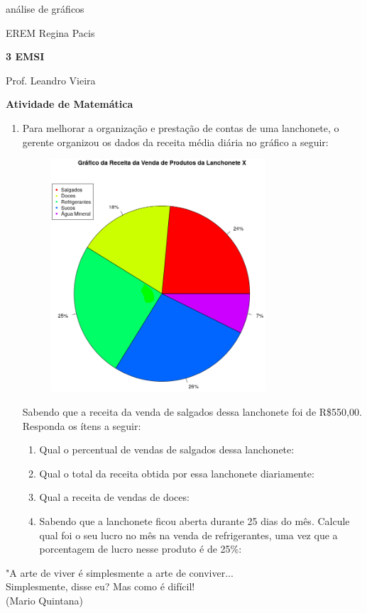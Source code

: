 \documentclass[oneside,a4paper,10pt]{article}
\newcommand{\EREM}{EREM Regina Pacis}
\newcommand{\curso}{\textbf{3 EMSI}}
\newcommand{\professor}{Prof. Leandro Vieira}
\begin{document}
\pagestyle{empty}
análise de gráficos

\begin{center}
\EREM
\par %
\curso
\par
\professor
\par
\LARGE \textbf{Atividade de Matemática}
\end{center}

\begin{enumerate}

\item Para melhorar a organização e prestação de contas de uma lanchonete, o gerente organizou os dados da receita média diária no gráfico a seguir:

\begin{figure}[h]
\center
\includegraphics[width=8cm]{Figuras/g1.png}
\end{figure}

Sabendo que a receita da venda de salgados dessa lanchonete foi de R\$550,00. Responda os ítens a seguir:
	\begin{enumerate}
	\item Qual o percentual de vendas de salgados dessa lanchonete:
	\item Qual o total da receita obtida por essa lanchonete diariamente:\
	\item Qual a receita de vendas de doces:
	\item Sabendo que a lanchonete ficou aberta durante 25 dias do mês. Calcule qual foi o seu lucro no mês na venda de refrigerantes, uma vez que a porcentagem de lucro nesse produto é de 25\%:
	\end{enumerate}


\end{enumerate}

\flushbottom 
\flushright
"A arte de viver é simplesmente a arte de conviver...\\Simplesmente, disse eu? Mas como é difícil!\\(Mario Quintana)
\end{document}
